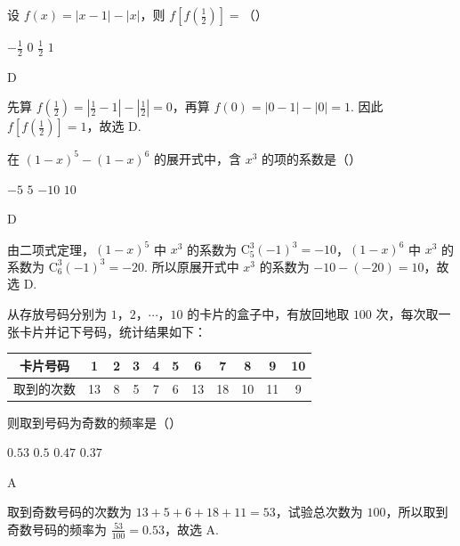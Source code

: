 \begin{problem}
设 \( f(x) = |x - 1| - |x| \)，则 \( f\left[f\left(\frac{1}{2}\right)\right] = \)（\quad）

\choices
    {\(-\frac{1}{2}\)}
    {\(0\)}
    {\( \frac{1}{2} \)}
    {\(1\)}

\begin{answer}
D
\end{answer}

\begin{solution}
先算 \(f(\frac{1}{2})=|\frac{1}{2}-1|-|\frac{1}{2}|=0\)，再算 \(f(0)=|0-1|-|0|=1\). 因此 \(f[f(\frac{1}{2})]=1\)，故选 D.
\end{solution}
\end{problem}

\begin{problem}
在 \((1 - x)^{5} - (1 - x)^{6}\) 的展开式中，含 \(x^{3}\) 的项的系数是（\quad）

\choices
    {\(-5\)}
    {\(5\)}
    {\(-10\)}
    {\(10\)}

\begin{answer}
D
\end{answer}

\begin{solution}
由二项式定理，\((1-x)^5\) 中 \(x^3\) 的系数为 \(\mathrm C_5^3(-1)^3=-10\)，\((1-x)^6\) 中 \(x^3\) 的系数为 \(\mathrm C_6^3(-1)^3=-20\). 所以原展开式中 \(x^3\) 的系数为 \(-10-(-20)=10\)，故选 D.
\end{solution}
\end{problem}

\begin{problem}
从存放号码分别为 \(1\)，\(2\)，\(\cdots\)，\(10\) 的卡片的盒子中，有放回地取 \(100\) 次，每次取一张卡片并记下号码，统计结果如下：

\begin{center}
\begin{tabular}{|c|c c c c c c c c c c|}
\hline
卡片号码 & 1 & 2 & 3 & 4 & 5 & 6 & 7 & 8 & 9 & 10 \\
\hline
取到的次数 & 13 & 8 & 5 & 7 & 6 & 13 & 18 & 10 & 11 & 9 \\
\hline
\end{tabular}
\end{center}

则取到号码为奇数的频率是（\quad）

\choices
    {\(0.53\)}
    {\(0.5\)}
    {\(0.47\)}
    {\(0.37\)}

\begin{answer}
A
\end{answer}

\begin{solution}
取到奇数号码的次数为 \(13+5+6+18+11=53\)，试验总次数为 \(100\)，所以取到奇数号码的频率为 \(\frac{53}{100}=0.53\)，故选 A.
\end{solution}
\end{problem}

